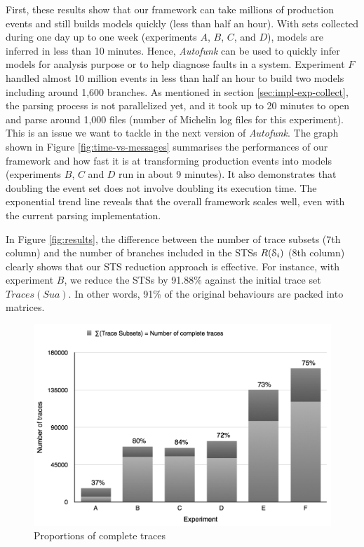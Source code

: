First, these results show that our framework can take millions
of production events and still builds models quickly (less than
half an hour). With sets collected during one day up to one
week (experiments $A$, $B$, $C$, and $D$), models are inferred in
less than 10 minutes. Hence, \textit{Autofunk} can be used to
quickly infer models for analysis purpose or to help diagnose
faults in a system. Experiment $F$ handled almost 10 million
events in less
than half an hour to build two models including around 1,600
branches. As mentioned in section \ref{sec:impl-exp-collect},
the parsing process is not parallelized yet, and it took up to 20
minutes to open and parse around 1,000 files (number of Michelin
log files for this experiment). This is an issue we want to
tackle in the next version of \textit{Autofunk}. The graph shown
in Figure \ref{fig:time-vs-messages} summarises the performances
of our framework and how fast it is at transforming production
events into models (experiments $B$, $C$ and $D$ run in about 9
minutes). It also demonstrates that doubling the event
set does not involve doubling its execution time. The exponential
trend line reveals that the overall framework scales well, even
with the current parsing implementation.

In Figure \ref{fig:results}, the difference between the number of
trace subsets (7th column) and the number of branches included in
the STSs $R(\EuScript{S}_i)$ (8th column) clearly shows that our
STS reduction approach is effective. For instance, with
experiment $B$, we reduce the STSs by 91.88\% against the initial
trace set $Traces(Sua)$. In other words, 91\% of the original
behaviours are packed into matrices.

\begin{figure}[H]
    \begin{center}
        \includegraphics[width=0.9\linewidth]{figures/proportions.png}
    \end{center}

    \caption{Proportions of complete traces}
    \label{fig:proportions}
\end{figure}

